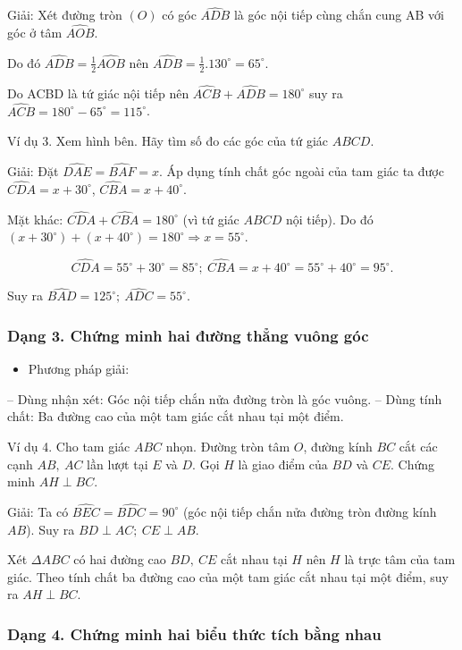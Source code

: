 \documentclass[%
    fontsize=12pt,%
    chapterprefix=false,%
    open=right,%
    twoside=false,%
    numbers=noenddot,%
    headings=optiontohead,%
    final,%
    DIV=15,%
    parskip=half %
]{scrbook}
\begin{document}
Giải: Xét đường tròn $(O)$ có góc $ \widehat{ADB} $ là góc nội tiếp cùng chắn cung AB với góc ở tâm $ \widehat{AOB} $.

Do đó $ \widehat{ADB} = \frac{1}{2} \widehat{AOB} $ nên $ \widehat{ADB} = \frac{1}{2}.130^\circ = 65^\circ $.

Do ACBD là tứ giác nội tiếp nên $ \widehat{ACB} + \widehat{ADB} = 180^\circ $ suy ra $ \widehat{ACB} = 180^\circ - 65^\circ = 115^\circ $.


Ví dụ 3. Xem hình bên. Hãy tìm số đo các góc của tứ giác $ABCD$.

Giải: Đặt $\widehat{DAE} = \widehat{BAF} = x$. Áp dụng tính chất góc ngoài của tam giác ta được $\widehat{CDA} = x + 30^\circ$, $\widehat{CBA} = x + 40^\circ$.

Mặt khác: $\widehat{CDA} + \widehat{CBA} = 180^\circ$ (vì tứ giác $ABCD$ nội tiếp). Do đó $(x + 30^\circ) + (x + 40^\circ) = 180^\circ \Rightarrow x = 55^\circ$.

\[\widehat{CDA} = 55^\circ + 30^\circ = 85^\circ;\ \widehat{CBA} = x + 40^\circ = 55^\circ + 40^\circ = 95^\circ.\]

Suy ra $\widehat{BAD} = 125^\circ;\ \widehat{ADC} = 55^\circ$.
\subsubsection{Dạng 3. Chứng minh hai đường thẳng vuông góc}

\begin{itemize}
  \item Phương pháp giải:
\end{itemize}

-- Dùng nhận xét: Góc nội tiếp chắn nửa đường tròn là góc vuông. -- Dùng tính chất: Ba đường cao của một tam giác cắt nhau tại một điểm.

Ví dụ 4. Cho tam giác $ABC$ nhọn. Đường tròn tâm $O$, đường kính $BC$ cắt các cạnh $AB,\ AC$ lần lượt tại $E$ và $D$. Gọi $H$ là giao điểm của $BD$ và $CE$. Chứng minh $AH \perp BC$.

Giải: Ta có $\widehat{BEC} = \widehat{BDC} = 90^\circ$ (góc nội tiếp chắn nửa đường tròn đường kính $AB$). Suy ra $BD \perp AC;\ CE \perp AB$.

Xét $\Delta ABC$ có hai đường cao $BD,\ CE$ cắt nhau tại $H$ nên $H$ là trực tâm của tam giác. Theo tính chất ba đường cao của một tam giác cắt nhau tại một điểm, suy ra $AH \perp BC$.
\subsubsection{Dạng 4. Chứng minh hai biểu thức tích bằng nhau}
\end{document}
